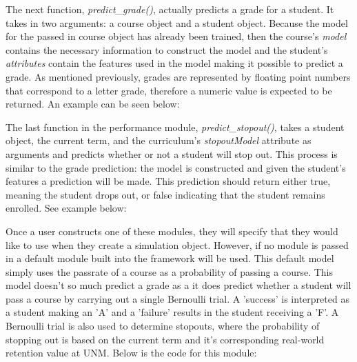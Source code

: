 \documentclass[botnum, fleqn]{unmeethesis}
\begin{document}
The next function, \textit{predict\_grade()}, actually predicts a grade for a student. It takes in two arguments: a course object and a student object. Because the model for the passed in course object has already been trained, then the course's \textit{model} contains the necessary information to construct the model and the student's \textit{attributes} contain the features used in the model making it possible to predict a grade. As mentioned previously, grades are represented by floating point numbers that correspond to a letter grade, therefore a numeric value is expected to be returned. An example can be seen below:



The last function in the performance module, \textit{predict\_stopout()}, takes a student object, the current term, and the curriculum's \textit{stopoutModel} attribute as arguments and predicts whether or not a student will stop out. This process is similar to the grade prediction: the model is constructed and given the student's features a prediction will be made. This prediction should return either true, meaning the student drops out, or false indicating that the student remains enrolled. See example below:



Once a user constructs one of these modules, they will specify that they would like to use when they create a simulation object. However, if no module is passed in a default module built into the framework will be used. This default model simply uses the passrate of a course as a probability of passing a course. This model doesn't so much predict a grade as a it does predict whether a student will pass a course by carrying out a single Bernoulli trial. A 'success' is interpreted as a student making an 'A' and a 'failure' results in the student receiving a 'F'. A Bernoulli trial is also used to determine stopouts, where the probability of stopping out is based on the current term and it's corresponding real-world retention value at UNM. Below is the code for this module:


\end{document}
